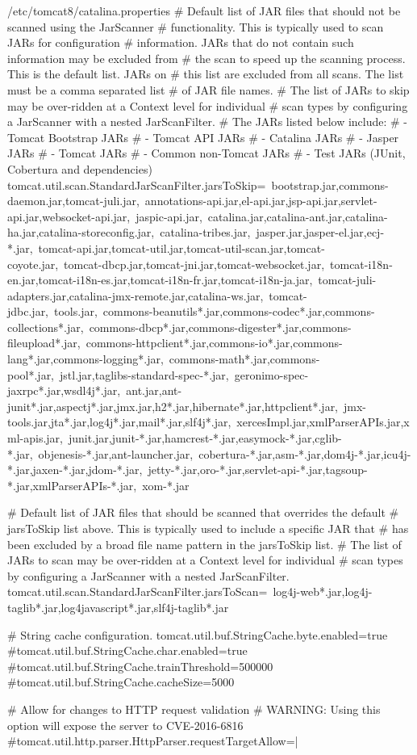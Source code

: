 \documentclass{tarentanleitung}
\begin{document}
\begin{lstdump}{/etc/tomcat8/catalina.properties}
# Default list of JAR files that should not be scanned using the JarScanner
# functionality. This is typically used to scan JARs for configuration
# information. JARs that do not contain such information may be excluded from
# the scan to speed up the scanning process. This is the default list. JARs on
# this list are excluded from all scans. The list must be a comma separated list
# of JAR file names.
# The list of JARs to skip may be over-ridden at a Context level for individual
# scan types by configuring a JarScanner with a nested JarScanFilter.
# The JARs listed below include:
# - Tomcat Bootstrap JARs
# - Tomcat API JARs
# - Catalina JARs
# - Jasper JARs
# - Tomcat JARs
# - Common non-Tomcat JARs
# - Test JARs (JUnit, Cobertura and dependencies)
tomcat.util.scan.StandardJarScanFilter.jarsToSkip=\
bootstrap.jar,commons-daemon.jar,tomcat-juli.jar,\
annotations-api.jar,el-api.jar,jsp-api.jar,servlet-api.jar,websocket-api.jar,\
jaspic-api.jar,\
catalina.jar,catalina-ant.jar,catalina-ha.jar,catalina-storeconfig.jar,\
catalina-tribes.jar,\
jasper.jar,jasper-el.jar,ecj-*.jar,\
tomcat-api.jar,tomcat-util.jar,tomcat-util-scan.jar,tomcat-coyote.jar,\
tomcat-dbcp.jar,tomcat-jni.jar,tomcat-websocket.jar,\
tomcat-i18n-en.jar,tomcat-i18n-es.jar,tomcat-i18n-fr.jar,tomcat-i18n-ja.jar,\
tomcat-juli-adapters.jar,catalina-jmx-remote.jar,catalina-ws.jar,\
tomcat-jdbc.jar,\
tools.jar,\
commons-beanutils*.jar,commons-codec*.jar,commons-collections*.jar,\
commons-dbcp*.jar,commons-digester*.jar,commons-fileupload*.jar,\
commons-httpclient*.jar,commons-io*.jar,commons-lang*.jar,commons-logging*.jar,\
commons-math*.jar,commons-pool*.jar,\
jstl.jar,taglibs-standard-spec-*.jar,\
geronimo-spec-jaxrpc*.jar,wsdl4j*.jar,\
ant.jar,ant-junit*.jar,aspectj*.jar,jmx.jar,h2*.jar,hibernate*.jar,httpclient*.jar,\
jmx-tools.jar,jta*.jar,log4j*.jar,mail*.jar,slf4j*.jar,\
xercesImpl.jar,xmlParserAPIs.jar,xml-apis.jar,\
junit.jar,junit-*.jar,hamcrest-*.jar,easymock-*.jar,cglib-*.jar,\
objenesis-*.jar,ant-launcher.jar,\
cobertura-*.jar,asm-*.jar,dom4j-*.jar,icu4j-*.jar,jaxen-*.jar,jdom-*.jar,\
jetty-*.jar,oro-*.jar,servlet-api-*.jar,tagsoup-*.jar,xmlParserAPIs-*.jar,\
xom-*.jar

# Default list of JAR files that should be scanned that overrides the default
# jarsToSkip list above. This is typically used to include a specific JAR that
# has been excluded by a broad file name pattern in the jarsToSkip list.
# The list of JARs to scan may be over-ridden at a Context level for individual
# scan types by configuring a JarScanner with a nested JarScanFilter.
tomcat.util.scan.StandardJarScanFilter.jarsToScan=\
log4j-web*.jar,log4j-taglib*.jar,log4javascript*.jar,slf4j-taglib*.jar

# String cache configuration.
tomcat.util.buf.StringCache.byte.enabled=true
#tomcat.util.buf.StringCache.char.enabled=true
#tomcat.util.buf.StringCache.trainThreshold=500000
#tomcat.util.buf.StringCache.cacheSize=5000

# Allow for changes to HTTP request validation
# WARNING: Using this option will expose the server to CVE-2016-6816
#tomcat.util.http.parser.HttpParser.requestTargetAllow=|
\end{lstdump}
\end{document}

